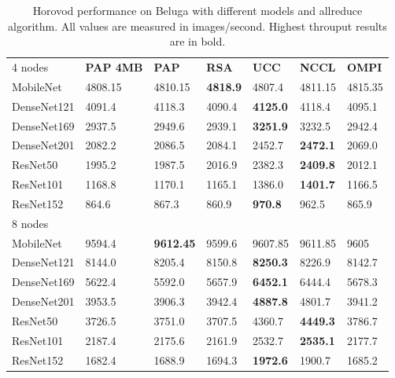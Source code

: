 \begin{table}
    \centering
    \caption[PAP-Aware Horovod Performance on Beluga]{
        Horovod performance on Beluga with different models and allreduce algorithm.
        All values are measured in images/second.
        Highest throuput results are in bold.
    }
    \begin{tabular}{lllllll}
     4 nodes    & \textbf{PAP 4MB} & \textbf{PAP} & \textbf{RSA} & \textbf{UCC} & \textbf{NCCL} & \textbf{OMPI} \\
    MobileNet   &    4808.15 &    4810.15   &    \textbf{4818.9}  &    4807.4  &    4811.15  &    4815.35  \\
    DenseNet121 & 4091.4    & 4118.3       & 4090.4  & \textbf{4125.0}    & 4118.4  & 4095.1  \\
    DenseNet169 & 2937.5    & 2949.6       & 2939.1  & \textbf{3251.9}  & 3232.5  & 2942.4  \\
    DenseNet201 & 2082.2    & 2086.5       & 2084.1  & 2452.7  & \textbf{2472.1}  & 2069.0    \\
    ResNet50    & 1995.2    & 1987.5       & 2016.9  & 2382.3  & \textbf{2409.8}  & 2012.1  \\
    ResNet101   & 1168.8    & 1170.1       & 1165.1  & 1386.0    & \textbf{1401.7}  & 1166.5  \\
    ResNet152   & 864.6     & 867.3        & 860.9   & \textbf{970.8}   & 962.5   & 865.9   \\ \hline
    8 nodes     & ~         & ~            & ~       & ~       & ~       & ~       \\
    MobileNet   &    9594.4  &    \textbf{9612.45}   &    9599.6  &    9607.85 &    9611.85  &    9605     \\
    DenseNet121 & 8144.0      & 8205.4       & 8150.8  & \textbf{8250.3}  & 8226.9  & 8142.7  \\
    DenseNet169 & 5622.4    & 5592.0         & 5657.9  & \textbf{6452.1}  & 6444.4  & 5678.3  \\
    DenseNet201 & 3953.5    & 3906.3       & 3942.4  & \textbf{4887.8}  & 4801.7  & 3941.2  \\
    ResNet50    & 3726.5    & 3751.0         & 3707.5  & 4360.7  & \textbf{4449.3}  & 3786.7  \\
    ResNet101   & 2187.4    & 2175.6       & 2161.9  & 2532.7  & \textbf{2535.1}  & 2177.7  \\
    ResNet152   & 1682.4    & 1688.9       & 1694.3  & \textbf{1972.6}  & 1900.7  & 1685.2  \\ \hline

\end{tabular}
\end{table}
